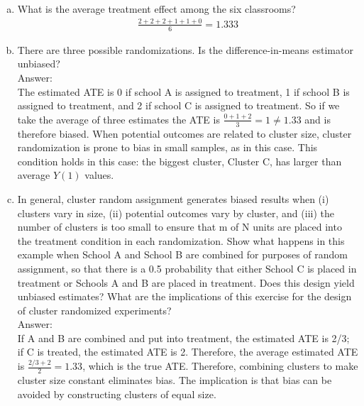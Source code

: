\documentclass[11pt,notitlepage]{article}\usepackage[]{graphicx}\usepackage[]{color}
\begin{document}
\begin{enumerate}[a)]
\item What is the average treatment effect among the six classrooms?
\begin{align*}
\frac{2+2+2+1+1+0}{6} = 1.333
\end{align*}

\item There are three possible randomizations. Is the difference-in-means estimator unbiased?\\
Answer:\\
The estimated ATE is 0 if school A is assigned to treatment, 1 if school B is assigned to treatment, and 2 if school C is assigned to treatment. So if we take the average of three estimates the ATE is $\frac{0+1+2}{3}=1 \neq 1.33$ and is therefore biased. When potential outcomes are related to cluster size, cluster randomization is prone to bias in small samples, as in this case. This condition holds in this case: the biggest cluster, Cluster C, has larger than average $Y(1)$ values.
\item In general, cluster random assignment generates biased results when (i) clusters vary in size, (ii) potential outcomes vary by cluster, and (iii) the number of clusters is too small to ensure that m of N units are placed into the treatment condition in each randomization.  Show what happens in this example when School A and School B are combined for purposes of random assignment, so that there is a 0.5 probability that either School C is placed in treatment or Schools A and B are placed in treatment. Does this design yield unbiased estimates?  What are the implications of this exercise for the design of cluster randomized experiments? \\
Answer:\\
If A and B are combined and put into treatment, the estimated ATE is 2/3; if C is treated, the estimated ATE is 2. Therefore, the average estimated ATE is $\frac{2/3+2}{2}=1.33$, which is the true ATE. Therefore, combining clusters to make cluster size constant eliminates bias.  The implication is that bias can be avoided by constructing clusters of equal size.
\end{enumerate}
\end{document}
